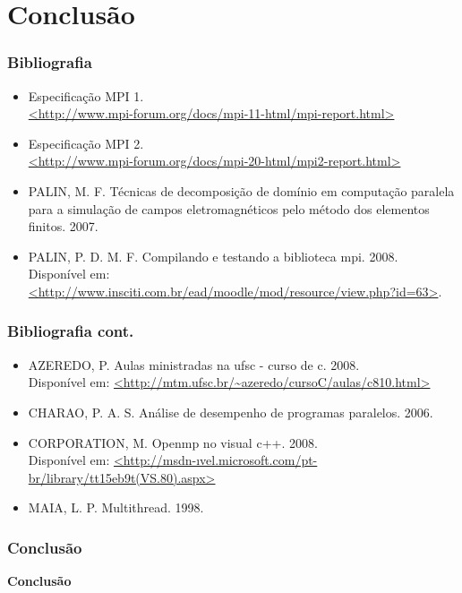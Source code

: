 \documentclass{beamer}
\begin{document}
\section{Conclusão} %
\begin{frame}
  \frametitle{Bibliografia}
  \begin{itemize}
\item Especificação MPI 1. \\
  \url{<http://www.mpi-forum.org/docs/mpi-11-html/mpi-report.html>}
\item Especificação MPI 2. \\
 \url{<http://www.mpi-forum.org/docs/mpi-20-html/mpi2-report.html>}
\item PALIN, M. F. Técnicas de decomposição de domínio em computação paralela para a simulação de campos eletromagnéticos pelo método dos elementos finitos. 2007.
 \item PALIN, P. D. M. F. Compilando e testando a biblioteca mpi. 2008.\\
Disponível em: \url{<http://www.insciti.com.br/ead/moodle/mod/resource/view.php?id=63>}.
  \end{itemize}
\end{frame}

\begin{frame}
  \frametitle{Bibliografia cont.}
  \begin{itemize}
\item AZEREDO, P. Aulas ministradas na ufsc - curso de c. 2008. \\
 Disponível em: \url{<http://mtm.ufsc.br/~azeredo/cursoC/aulas/c810.html>}
\item CHARAO, P. A. S. Análise de desempenho de programas paralelos. 2006.
\item CORPORATION, M. Openmp no visual c++. 2008.\\
 Disponível em: \url{<http://msdn-ıvel.microsoft.com/pt-br/library/tt15eb9t(VS.80).aspx>}
\item MAIA, L. P. Multithread. 1998.
  \end{itemize}
\end{frame}

\begin{frame}
  \frametitle{Conclusão}
  \begin{center}
   \large \textbf{Conclusão}
  \end{center}

\end{frame}
\end{document}
